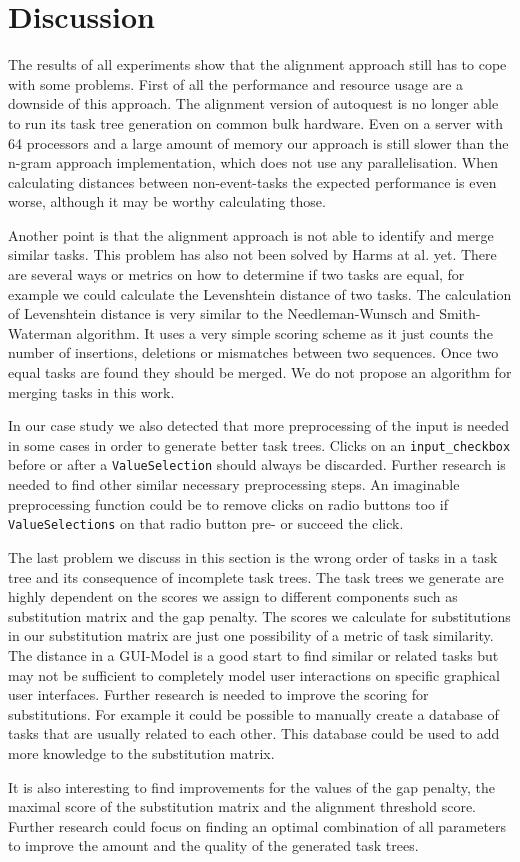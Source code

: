 \section{Discussion}
The results of all experiments show that the alignment approach still has to cope with some problems.
First of all the performance and resource usage are a downside of this approach. 
The alignment version of autoquest is no longer able to run its task tree generation on common bulk hardware. 
Even on a server with 64 processors and a large amount of memory our approach is still slower than the n-gram approach implementation, which does not use any parallelisation.
When calculating distances between non-event-tasks the expected performance is even worse, although it may be worthy calculating those.

Another point is that the alignment approach is not able to identify and merge similar tasks. 
This problem has also not been solved by Harms at al. yet. 
There are several ways or metrics on how to determine if two tasks are equal, for example we could calculate the Levenshtein distance of two tasks. 
The calculation of Levenshtein distance is very similar to the Needleman-Wunsch and Smith-Waterman algorithm. 
It uses a very simple scoring scheme as it just counts the number of insertions, deletions or mismatches between two sequences.
Once two equal tasks are found they should be merged. 
We do not propose an algorithm for merging tasks in this work.

In our case study we also detected that more preprocessing of the input is needed in some cases in order to generate better task trees.
Clicks on an \texttt{input\_checkbox} before or after a \texttt{ValueSelection} should always be discarded. 
Further research is needed to find other similar necessary preprocessing steps. 
An imaginable preprocessing function could be to remove clicks on radio buttons too if \texttt{ValueSelections} on that radio button pre- or succeed the click.

The last problem we discuss in this section is the wrong order of tasks in a task tree and its consequence of incomplete task trees.
The task trees we generate are highly dependent on the scores we assign to different components such as substitution matrix and the gap penalty.
The scores we calculate for substitutions in our substitution matrix are just one possibility of a metric of task similarity. 
The distance in a GUI-Model is a good start to find similar or related tasks but may not be sufficient to completely model user interactions on specific graphical user interfaces.
Further research is needed to improve the scoring for substitutions. 
For example it could be possible to manually create a database of tasks that are usually related to each other.
This database could be used to add more knowledge to the substitution matrix.

It is also interesting to find improvements for the values of the gap penalty, the maximal score of the substitution matrix and the alignment threshold score.
Further research could focus on finding an optimal combination of all parameters to improve the amount and the quality of the generated task trees.



